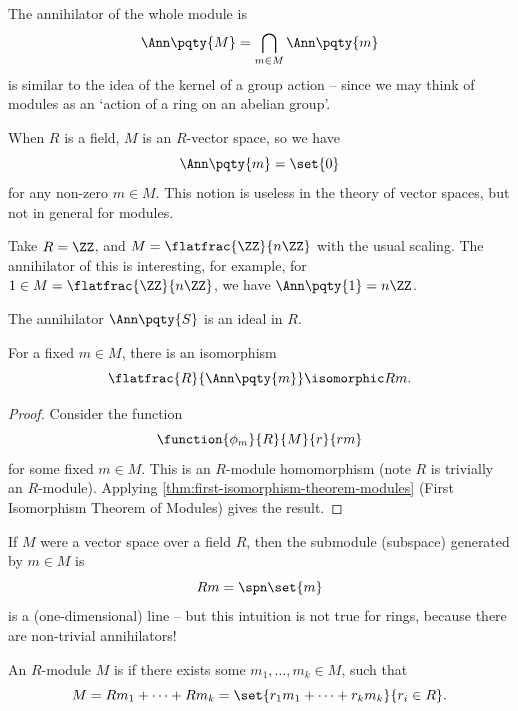 The annihilator of the whole module is
\[
    \Ann\pqty{M} = \bigcap_{m \in M} \Ann\pqty{m}
\]
is similar to the idea of the kernel of a group action -- since we may think of modules as an `action of a ring on an abelian group'.

When \(R\) is a field, \(M\) is an \(R\)-vector space, so we have
\[
    \Ann\pqty{m} = \set{0}
\]
for any non-zero \(m \in M\). This notion is useless in the theory of vector spaces, but not in general for modules.

\begin{example*}[Annihilator]
    Take \(R = \ZZ\), and \(M = \flatfrac{\ZZ}{n\ZZ}\) with the usual scaling. The annihilator of this is interesting, for example, for \(1 \in M = \flatfrac{\ZZ}{n\ZZ}\), we have \(\Ann\pqty{1} = n\ZZ\).
\end{example*}

\begin{proposition}
    \label{prop:annihilator-ideal}%
    The annihilator \(\Ann\pqty{S}\) is an ideal in \(R\).
\end{proposition}

\begin{proposition}
    \label{prop:isomorphism-annihilator-submodule}%
    For a fixed \(m \in M\), there is an isomorphism
    \[
        \flatfrac{R}{\Ann\pqty{m}} \isomorphic Rm.
    \]
\end{proposition}

\begin{proof}
    Consider the function
    \[
        \function{\phi_m}{R}{M}{r}{rm}
    \]
    for some fixed \(m \in M\). This is an \(R\)-module homomorphism (note \(R\) is trivially an \(R\)-module). Applying \autoref{thm:first-isomorphism-theorem-modules} (First Isomorphism Theorem of Modules) gives the result.
\end{proof}

\begin{remark}
    If \(M\) were a vector space over a field \(R\), then the submodule (subspace) generated by \(m \in M\) is
    \[
        Rm = \spn\set{m}
    \]
    is a (one-dimensional) line -- but this intuition is not true for rings, because there are non-trivial annihilators!
\end{remark}

\begin{definition}
    \label{def:finitely-generated-module}%
    An \(R\)-module \(M\) is  if there exists some \(m_1, \ldots, m_k \in M\), such that
    \[
        M = R m_1 + \cdots + R m_k = \set{r_1 m_1 + \cdots + r_k m_k}{r_i \in R}.
    \]
\end{definition}

